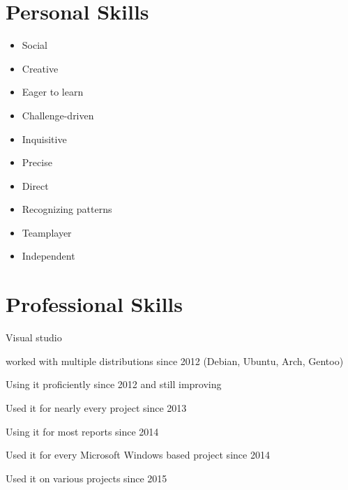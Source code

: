 \documentclass[]{friggeri-cv} %
\begin{document}

\section{Personal Skills}

\begin{multicols}{2}
   \begin{itemize}
      \item Social
      \item Creative
      \item Eager to learn
      \item Challenge-driven
      \item Inquisitive
      \item Precise
      \item Direct
      \item Recognizing patterns
      \item Teamplayer
      \item Independent
   \end{itemize}
\end{multicols}


\section{Professional Skills}

\begin{labeling}{Visual studio}
\item [Linux] worked with multiple distributions since 2012 (Debian, Ubuntu, Arch, Gentoo)
\item [Vim] Using it proficiently since 2012 and still improving
\item [Git] Used it for nearly every project since 2013
\item [\LaTeX] Using it for most reports since 2014
\item [Visual studio] Used it for every Microsoft Windows based project since 2014
\item [CVS] Used it on various projects since 2015
\end{labeling}

\end{document}
